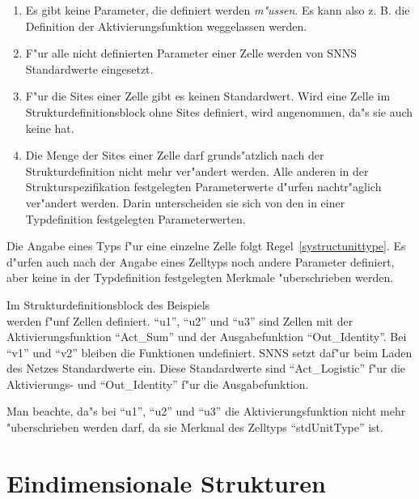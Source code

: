 \begin{enumerate}
  
\item Es gibt keine Parameter, die definiert werden {\it m"ussen\/}. Es kann also z. B. die
Definition der Aktivierungsfunktion
weggelassen werden.
  
\item F"ur alle nicht definierten Parameter einer Zelle werden von SNNS Standardwerte
eingesetzt.  

\item F"ur die Sites einer Zelle gibt es keinen
Standardwert. Wird eine Zelle im Strukturdefinitionsblock ohne
Sites definiert, wird angenommen, da"s sie auch keine hat.

\item Die Menge der Sites einer Zelle darf grunds"atzlich nach der
Strukturdefinition nicht mehr ver"andert werden. Alle anderen in der
Strukturspezifikation 	festgelegten Parameterwerte
 d"urfen nachtr"aglich
ver"andert werden. Darin unterscheiden sie sich von den in einer
Typdefinition festgelegten Parameterwerten.
\end{enumerate}

Die Angabe eines Typs f"ur eine einzelne Zelle folgt
Regel~\ref{systructunittype}. Es d"urfen auch nach der Angabe eines
Zelltyps noch andere Parameter definiert,
aber keine in der Typdefinition festgelegten Merkmale "uberschrieben
werden.

Im Strukturdefinitionsblock des Beispiels\\



werden f"unf Zellen definiert. ``u1'', ``u2'' und ``u3'' sind Zellen
mit der Aktivierungsfunktion ``Act\_Sum'' und der Ausgabefunktion
``Out\_Identity''. Bei ``v1'' und ``v2'' bleiben die Funktionen
undefiniert. SNNS setzt daf"ur beim Laden des Netzes Standardwerte
ein. Diese Standardwerte sind ``Act\_Logistic'' f"ur die Aktivierungs-
und ``Out\_Identity'' f"ur die Ausgabefunktion.

Man beachte, da"s bei ``u1'', ``u2'' und ``u3'' die
Aktivierungsfunktion nicht mehr "uberschrieben werden darf, da sie
Merkmal des Zelltyps ``stdUnitType'' ist.



\section{Eindimensionale Strukturen}
\label{EinDimStrukturen}

